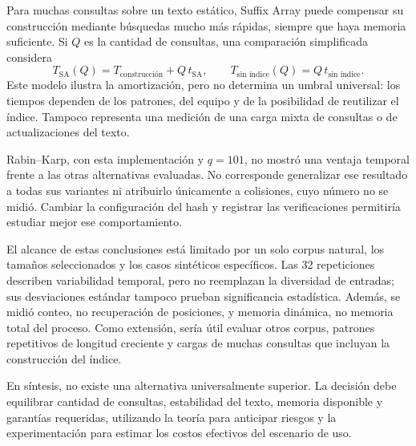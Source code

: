 Para muchas consultas sobre un texto estático, Suffix Array puede
compensar su construcción mediante búsquedas mucho más rápidas, siempre
que haya memoria suficiente. Si \(Q\) es la cantidad de consultas, una
comparación simplificada considera
\[
    T_{\mathrm{SA}}(Q)=T_{\text{construcción}}+Q\,t_{\mathrm{SA}},
    \qquad
    T_{\text{sin índice}}(Q)=Q\,t_{\text{sin índice}}.
\]
Este modelo ilustra la amortización, pero no determina un umbral universal:
los tiempos dependen de los patrones, del equipo y de la posibilidad de
reutilizar el índice. Tampoco representa una medición de una carga mixta
de consultas o de actualizaciones del texto.

Rabin--Karp, con esta implementación y \(q=101\), no mostró una ventaja
temporal frente a las otras alternativas evaluadas. No corresponde
generalizar ese resultado a todas sus variantes ni atribuirlo únicamente
a colisiones, cuyo número no se midió. Cambiar la configuración del hash
y registrar las verificaciones permitiría estudiar mejor ese comportamiento.

El alcance de estas conclusiones está limitado por un solo corpus natural,
los tamaños seleccionados y los casos sintéticos específicos. Las
32 repeticiones describen variabilidad temporal, pero no reemplazan la
diversidad de entradas; sus desviaciones estándar tampoco prueban
significancia estadística. Además, se midió conteo, no recuperación de
posiciones, y memoria dinámica, no memoria total del proceso. Como extensión,
sería útil evaluar otros corpus, patrones repetitivos de longitud creciente
y cargas de muchas consultas que incluyan la construcción del índice.

En síntesis, no existe una alternativa universalmente superior. La decisión
debe equilibrar cantidad de consultas, estabilidad del texto, memoria
disponible y garantías requeridas, utilizando la teoría para anticipar
riesgos y la experimentación para estimar los costos efectivos del
escenario de uso.
